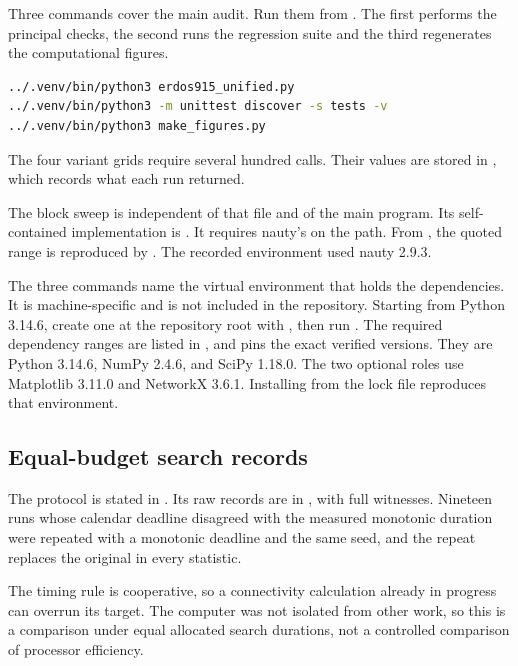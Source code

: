 Three commands cover the main audit. Run them from .
The first performs the principal checks, the second runs the regression suite
and the third regenerates the computational figures.
\begin{lstlisting}[language=bash,numbers=none,basicstyle=\ttfamily\small]
../.venv/bin/python3 erdos915_unified.py
../.venv/bin/python3 -m unittest discover -s tests -v
../.venv/bin/python3 make_figures.py
\end{lstlisting}

The four variant grids require several hundred  calls. Their values
are stored in , which records what
each run returned.

The block sweep is independent of that file and of the main program. Its
self-contained implementation is
. It requires nauty's
 on the path. From , the quoted range is reproduced
by . The recorded
environment used nauty 2.9.3.

The three commands name the virtual environment that holds the dependencies. It
is machine-specific and is not included in the repository.
Starting from Python 3.14.6, create one at the repository root with
, then run
.
The required dependency ranges are listed in
, and  pins
the exact verified versions. They are Python 3.14.6, NumPy 2.4.6,
and SciPy 1.18.0. The two optional roles use Matplotlib 3.11.0 and
NetworkX 3.6.1. Installing from the lock file reproduces that environment.

\subsection{Equal-budget search records}\label{sec:equal-budget-details}

The protocol is stated in . Its raw records are in
, with full witnesses. Nineteen
runs whose calendar deadline disagreed with the measured monotonic duration
were repeated with a monotonic deadline and the same seed, and the repeat
replaces the original in every statistic.

The timing rule is cooperative, so a connectivity calculation already in
progress can overrun its target. The computer was not isolated from
other work, so this is a comparison under equal allocated search durations,
not a controlled comparison of processor efficiency.

